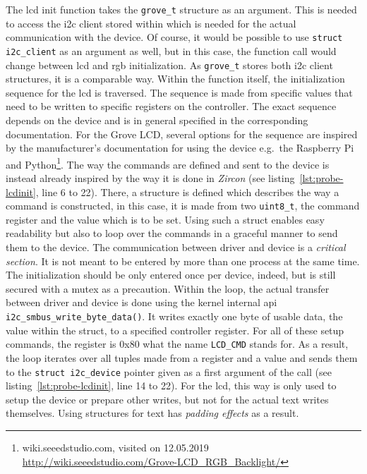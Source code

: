 The \ac{lcd} init function takes the \texttt{grove_t} structure as an argument.
This is needed to access the \ac{i2c} client stored within which is needed for the actual communication with the device.
Of course, it would be possible to use \texttt{struct i2c_client} as an argument as well, but in this case, the function call would change between \ac{lcd} and \ac{rgb} initialization.
As \texttt{grove_t} stores both \ac{i2c} client structures, it is a comparable way.
Within the function itself, the initialization sequence for the \ac{lcd} is traversed.
The sequence is made from specific values that need to be written to specific registers on the controller.
The exact sequence depends on the device and is in general specified in the corresponding documentation.
For the Grove LCD, several options for the sequence are inspired by the manufacturer's documentation for using the device e.g.\ the Raspberry Pi and Python\footnote{wiki.seeedstudio.com, visited on 12.05.2019 \url{http://wiki.seeedstudio.com/Grove-LCD_RGB_Backlight/}}.
The way the commands are defined and sent to the device is instead already inspired by the way it is done in \textit{Zircon} (see listing~\ref{lst:probe-lcdinit}, line 6 to 22).
There, a structure is defined which describes the way a command is constructed, in this case, it is made from two \texttt{uint8_t}, the command register and the value which is to be set.
Using such a struct enables easy readability but also to loop over the commands in a graceful manner to send them to the device.
The communication between driver and device is a \textit{critical section}.
It is not meant to be entered by more than one process at the same time.
The initialization should be only entered once per device, indeed, but is still secured with a mutex as a precaution.
Within the loop, the actual transfer between driver and device is done using the kernel internal \ac{api} \texttt{i2c_smbus_write_byte_data()}.
It writes exactly one byte of usable data, the value within the struct, to a specified controller register.
For all of these setup commands, the register is 0x80 what the name \texttt{LCD_CMD} stands for.
As a result, the loop iterates over all tuples made from a register and a value and sends them to the \texttt{struct i2c_device} pointer given as a first argument of the call (see listing~\ref{lst:probe-lcdinit}, line 14 to 22).
For the \ac{lcd}, this way is only used to setup the device or prepare other writes, but not for the actual text writes themselves.
Using structures for text has \textit{padding effects} as a result.
